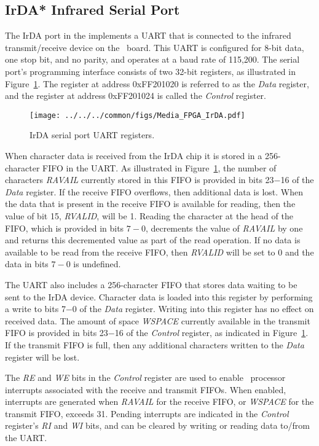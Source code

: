 \subsection{IrDA* Infrared Serial Port}

\label{sec:serial_port}

The IrDA port in the {\it \systemNameFull} implements a UART that is connected to the infrared
transmit/receive device on the \DEBoard~board.
This UART is configured for 8-bit data, one stop bit, and no parity, and
operates at a baud rate of 115,200.  The serial port's programming interface 
consists of two 32-bit registers, as illustrated in Figure~\ref{fig:serial_port}. 
The register at address {\sf 0xFF201020} is referred to as the
{\it Data} register, and the register at address {\sf 0xFF201024} is called the {\it
Control} register.

\begin{figure}[h!]
   \begin{center}
       \texttt{[image: ../../../common/figs/Media\_FPGA\_IrDA.pdf]}
   \end{center}
   \caption{IrDA serial port UART registers.}
	\label{fig:serial_port}
\end{figure}

When character data is received from the IrDA chip it is stored in a 256-character
FIFO in the UART. As illustrated in Figure~\ref{fig:serial_port}, the number 
of characters {\it RAVAIL} currently stored in this FIFO is
provided in bits 23$-$16 of the {\it Data} register.  If the receive FIFO overflows, then
additional data is lost.  When the data that is present in the receive FIFO is available 
for reading, then the value of bit 15, {\it RVALID}, will be 1. Reading the character at
the head of the FIFO, which is provided in bits $7-0$, decrements the value of {\it RAVAIL} 
by one and returns this decremented value as part of the read
operation. If no data is available to be read from the receive FIFO, then {\it RVALID} will 
be set to 0 and the data in bits $7-0$ is undefined.

The UART	also includes a 256-character FIFO that stores data waiting to be sent to the
IrDA device.  Character data is loaded into this register by performing a write to bits 7$-$0
of the {\it Data} register.  Writing into this register has no effect 
on received data.  The amount of space {\it WSPACE} currently available in the transmit FIFO is 
provided in bits 23$-$16 of the {\it Control} register, as indicated 
in Figure~\ref{fig:serial_port}.  If
the transmit FIFO is full, then any additional characters written to the {\it Data} 
register will be lost.

The {\it RE} and {\it WE} bits in the {\it Control} register are used to 
enable \processor~processor interrupts associated with the receive and transmit FIFOs. When enabled, 
interrupts are generated when {\it RAVAIL} for the receive FIFO, or {\it WSPACE} for
the transmit FIFO, exceeds 31. Pending interrupts are indicated in the {\it Control}
register's {\it RI} and {\it WI} bits, and can be cleared by writing or reading data
to/from the UART.


